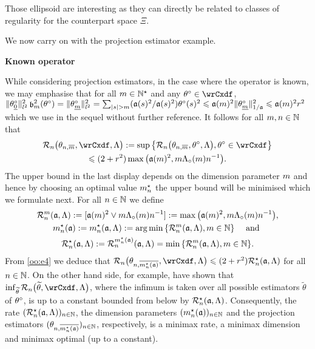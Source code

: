 Those ellipsoid are interesting as they can directly be related to classes of regularity for the counterpart space $\Xi$.

We now carry on with the projection estimator example.

\textbf{Known operator}

While considering projection estimators, in the case where the operator is known, we may emphasise that for all $\Di\in\Nz^{\star}$ and  any $\xdf\in\rwCxdf$, $\Vnormlp{\xdf_{\underline{0}}}^2\bias^2(\xdf)=\Vnormlp{\xdf_{\underline{\Di}}}^2=\sum_{ \vert s \vert >\Di}(\xdfCw[(s)]^2/\xdfCw[(s)]^2)\fxdf[(s)]^2\leq
\xdfCw[(\Di)]^2\Vnorm[1/{\xdfCw[]}]{\xdf_{\underline{\Di}}}^2\leq
\xdfCw[(\Di)]^2\xdfCr^2$ which we use in the sequel
without further reference.
It follows for all $\Di,\ssY\in\Nz$ that 
  \begin{multline}\label{oo:e4}
\nRi{\txdfPr}{\rwCxdf,\Lambda}:=\sup\set{\nRi{\txdfPr}{\xdf,\Lambda},\xdf\in\rwCxdf}\\
\leq (2+\xdfCr^2)\max\big(\xdfCw^2,\Di \oiSv \ssY^{-1}\big).
\end{multline}
The upper bound in the last display depends on the dimension parameter
$\Di$ and hence by choosing an optimal value $\mnDi$ the upper bound
will be minimised which we formulate next. For all $n\in\Nz$ we define
\begin{multline}
  \label{mm:de:nra}
 \dRa{\Di}{\xdfCw[],\Lambda}:=[\xdfCw^2\vee\Di\oiSv \ssY^{-1}]:=\max\big(\xdfCw^2,\Di \oiSv \ssY^{-1}\big),\\
\hfill \mnDi(\xdfCw[]):=\mnDi(\xdfCw[],\Lambda):=\argmin\Nset[{\Di\in\Nz}]{\dRa{\Di}{\xdfCw[],\Lambda}}\quad\text{ and }\hfill\\\mnRa{\xdfCw[],\Lambda}:=\dRa{\mnDi({\xdfCw[]})}{\xdfCw[],\Lambda}=\min\Nset[{\Di\in\Nz}]{\dRa{\Di}{\xdfCw[],\Lambda}}.
\end{multline}
From \eqref{oo:e4} we deduce that
$\nRi{\txdfPr[\mnDi({\xdfCw[]})]}{\rwCxdf,\Lambda}\leq(2+\xdfCr^2)\mnRa{\xdfCw[],\Lambda}$ for
all $n\in\Nz$. On the other
  hand side, for example,  have shown  that
  $\inf_{\widetilde{\theta}}\nRi{\widetilde{\theta}}{\rwCxdf,\Lambda}$, where the infimum is taken over all
  possible estimators $\widetilde{\theta}$ of $\xdf$, is up to a constant bounded
  from below by $\mnRa{\xdfCw[],\Lambda}$.  Consequently, the rate
  $\Nsuite[n]{\mnRa{\xdfCw[],\Lambda}}$, the dimension parameters $\Nsuite[n]{\mnDi(\xdfCw[])}$
  and the projection estimators $\Nsuite[n]{\txdfPr[\mnDi({\xdfCw[]})]}$, respectively, is a
  minimax rate, a minimax dimension and minimax optimal (up to a
  constant).

